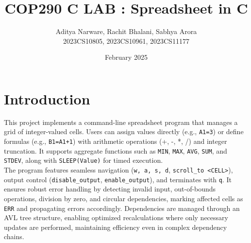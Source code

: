 \documentclass{report}
\title{COP290 C LAB : Spreadsheet in C\\}
\author{Aditya Narware, Rachit Bhalani, Sabhya Arora\\2023CS10805, 2023CS10961, 2023CS11177}
\date{February 2025}
\begin{document}
\maketitle

\newpage

\section*{Introduction}
This project implements a command-line spreadsheet program that manages a grid of integer-valued cells. Users can assign values directly (e.g., \texttt{A1=3}) or define formulas (e.g., \texttt{B1=A1+1}) with arithmetic operations (+, -, *, /) and integer truncation. It supports aggregate functions such as \texttt{MIN}, \texttt{MAX}, \texttt{AVG}, \texttt{SUM}, and \texttt{STDEV}, along with \texttt{SLEEP(Value)} for timed execution.\\ 
The program features seamless navigation (\texttt{w, a, s, d}, \texttt{scroll\_to <CELL>}), output control (\texttt{disable\_output}, \texttt{enable\_output}), and terminates with \texttt{q}. It ensures robust error handling by detecting invalid input, out-of-bounds operations, division by zero, and circular dependencies, marking affected cells as \texttt{ERR} and propagating errors accordingly. Dependencies are managed through an AVL tree structure, enabling optimized recalculations where only necessary updates are performed, maintaining efficiency even in complex dependency chains.

\end{document}
